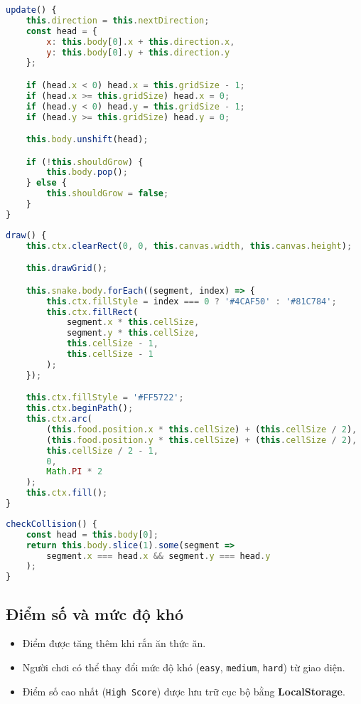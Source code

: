 \documentclass[a4paper, 12pt]{article}
\begin{document}
\begin{lstlisting}[language=JavaScript, caption={Phương thức cập nhật vị trí của rắn}]
update() {
    this.direction = this.nextDirection;
    const head = {
        x: this.body[0].x + this.direction.x,
        y: this.body[0].y + this.direction.y
    };

    if (head.x < 0) head.x = this.gridSize - 1;
    if (head.x >= this.gridSize) head.x = 0;
    if (head.y < 0) head.y = this.gridSize - 1;
    if (head.y >= this.gridSize) head.y = 0;

    this.body.unshift(head);

    if (!this.shouldGrow) {
        this.body.pop();
    } else {
        this.shouldGrow = false;
    }
}
\end{lstlisting}

\begin{lstlisting}[language=JavaScript, caption={Hàm khởi tạo và cập nhật đồ họa}]
draw() {
    this.ctx.clearRect(0, 0, this.canvas.width, this.canvas.height);

    this.drawGrid();

    this.snake.body.forEach((segment, index) => {
        this.ctx.fillStyle = index === 0 ? '#4CAF50' : '#81C784';
        this.ctx.fillRect(
            segment.x * this.cellSize,
            segment.y * this.cellSize,
            this.cellSize - 1,
            this.cellSize - 1
        );
    });

    this.ctx.fillStyle = '#FF5722';
    this.ctx.beginPath();
    this.ctx.arc(
        (this.food.position.x * this.cellSize) + (this.cellSize / 2),
        (this.food.position.y * this.cellSize) + (this.cellSize / 2),
        this.cellSize / 2 - 1,
        0,
        Math.PI * 2
    );
    this.ctx.fill();
}
\end{lstlisting}

\begin{lstlisting}[language=JavaScript, caption={Phương thức kiểm tra va chạm giữa đầu và thân rắn}]
checkCollision() {
    const head = this.body[0];
    return this.body.slice(1).some(segment =>
        segment.x === head.x && segment.y === head.y
    );
}
\end{lstlisting}

\subsection{Điểm số và mức độ khó}
\begin{itemize}
    \item Điểm được tăng thêm khi rắn ăn thức ăn.
    \item Người chơi có thể thay đổi mức độ khó (\texttt{easy}, \texttt{medium}, \texttt{hard}) từ giao diện.
    \item Điểm số cao nhất (\texttt{High Score}) được lưu trữ cục bộ bằng \textbf{LocalStorage}.
\end{itemize}
\end{document}
